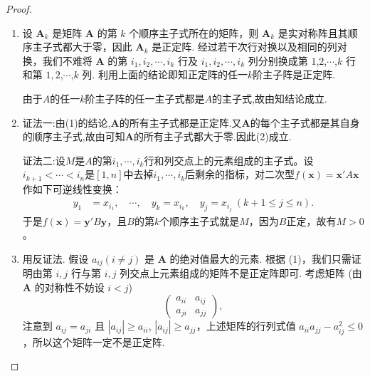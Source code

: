 \documentclass[../../main.tex]{subfiles}%
\begin{document}
\begin{proof}
\begin{enumerate}[(1)]
\item 设 $\boldsymbol{A}_k$ 是矩阵 $\boldsymbol{A}$ 的第 $k$ 个顺序主子式所在的矩阵，则 $\boldsymbol{A}_k$ 是实对称阵且其顺序主子式都大于零，因此 $\boldsymbol{A}_k$ 是正定阵.
经过若干次行对换以及相同的列对换，我们不难将 $\boldsymbol{A}$ 的第 $i_1,i_2,\cdots,i_k$ 行及 $i_1,i_2,\cdots,i_k$ 列分别换成第 $1$,$2$,$\cdots$,$k$ 行和第 $1,2$,$\cdots$,$k$ 列. 利用上面的结论即知正定阵的任一$k$阶主子阵是正定阵.

由于$A$的任一$k$阶主子阵的任一主子式都是$A$的主子式,故由知结论成立.

\item {\color{blue}证法一:}由(1)的结论,$\boldsymbol{A}$的所有主子式都是正定阵.又$\boldsymbol{A}$的每个主子式都是其自身的顺序主子式,故由可知$\boldsymbol{A}$的所有主子式都大于零.因此(2)成立.

{\color{blue}证法二:}设\(M\)是\(A\)的第\(i_1,\cdots,i_k\)行和列交点上的元素组成的主子式。设\(i_{k + 1}<\cdots < i_n\)是\([1,n]\)中去掉\(i_1,\cdots,i_k\)后剩余的指标，对二次型\(f(\boldsymbol{x})=\boldsymbol{x}'A\boldsymbol{x}\)作如下可逆线性变换：
\begin{align*}
y_1&=x_{i_1},\quad\cdots,\quad y_k = x_{i_k},\quad y_j = x_{i_j}\ (k + 1\leqslant  j\leqslant  n).
\end{align*}
于是\(f(\boldsymbol{x})=\boldsymbol{y}'B\boldsymbol{y}\)，且\(B\)的第\(k\)个顺序主子式就是\(M\)，因为\(B\)正定，故有\(M > 0\)。

\item 用反证法. 假设 $a_{ij}(i\neq j)$ 是 $\boldsymbol{A}$ 的绝对值最大的元素. 根据 (1)，我们只需证明由第 $i,j$ 行与第 $i,j$ 列交点上元素组成的矩阵不是正定阵即可. 考虑矩阵 (由 $\boldsymbol{A}$ 的对称性不妨设 $i < j$)
\[
\begin{pmatrix}
a_{ii} & a_{ij}\\
a_{ji} & a_{jj}
\end{pmatrix},
\]
注意到 $a_{ij} = a_{ji}$ 且 $|a_{ij}|\geqslant  a_{ii}$, $|a_{ij}|\geqslant  a_{jj}$，上述矩阵的行列式值 $a_{ii}a_{jj}-a_{ij}^2\leqslant  0$，所以这个矩阵一定不是正定阵. 
\end{enumerate}
\end{proof}
\end{document}
